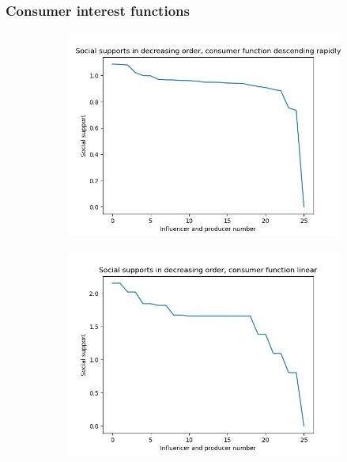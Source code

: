 \documentclass[11pt, letterpaper]{article}
\begin{document}
\subsubsection{Consumer interest functions}

\begin{figure}[h]
    \centering
\begin{adjustbox}{max width=1.5\textwidth,center}
    \begin{subfigure}[b]{0.45\textwidth}
        \includegraphics[width=\linewidth]{"figures/f/descending rapidly_supps.jpg"}
    \end{subfigure}
    \begin{subfigure}[b]{0.45\textwidth}
        \includegraphics[width=\linewidth]{"figures/f/linear_supps.jpg"}

\end{subfigure}
\end{adjustbox}
\end{figure}
\end{document}

